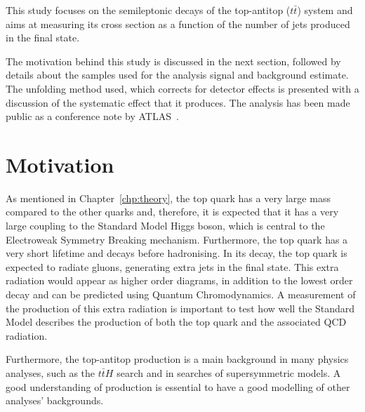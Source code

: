 



This study focuses on the semileptonic decays of the top-antitop ($t\bar{t}$) system
and aims at measuring its cross section as a function of the number of jets produced in the final state.

The motivation behind this study is discussed in the next section, followed by details about the samples used for the analysis signal and background estimate.
The unfolding method used, which corrects for detector effects is presented with a discussion of the systematic effect that it produces.
The analysis has been made public as a conference note by ATLAS~\cite{ttjets_confnote}.

\section{Motivation}

As mentioned in Chapter~\ref{chp:theory},
the top quark has a very large mass compared to the other quarks
and, therefore, it is expected that it has a very large coupling to the Standard Model Higgs boson, which is central to the Electroweak Symmetry Breaking mechanism.
Furthermore, the top quark has a very short lifetime and decays before hadronising.
In its decay, the top quark is expected to radiate gluons, generating extra jets in the final state. This extra radiation
would appear as higher order diagrams, in addition to the lowest order decay and can be predicted using Quantum Chromodynamics.
A measurement of the production of this extra radiation is important to test how well the Standard Model describes the production of both the top quark and the associated QCD radiation.

Furthermore, the top-antitop production is a main background in many physics analyses,
such as the $t\bar{t}H$ search and in searches of supersymmetric models.
A good understanding of \ttbar production is essential to have a good modelling of other analyses' backgrounds.

